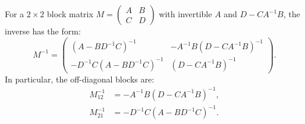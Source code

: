 \begin{lemma}\label{lem:block-inversion}
For a $2 \times 2$ block matrix $M = \begin{pmatrix} A & B \\ C & D \end{pmatrix}$ with invertible $A$ and $D - CA^{-1}B$, the inverse has the form:
\[
M^{-1} = \begin{pmatrix}
(A - BD^{-1}C)^{-1} & -A^{-1}B(D - CA^{-1}B)^{-1} \\
-D^{-1}C(A - BD^{-1}C)^{-1} & (D - CA^{-1}B)^{-1}
\end{pmatrix}.
\]
In particular, the off-diagonal blocks are:
\begin{align}
M^{-1}_{12} &= -A^{-1}B(D - CA^{-1}B)^{-1}, \label{eq:block-inv-12}\\
M^{-1}_{21} &= -D^{-1}C(A - BD^{-1}C)^{-1}. \label{eq:block-inv-21}
\end{align}
\end{lemma}
